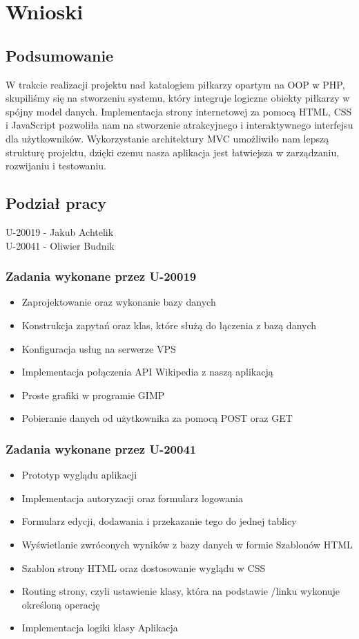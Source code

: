 \section{Wnioski}
    \subsection{Podsumowanie}
    W trakcie realizacji projektu nad katalogiem piłkarzy opartym na OOP w PHP, skupiliśmy się na stworzeniu  systemu, który integruje logiczne obiekty piłkarzy w spójny model danych. Implementacja strony internetowej za pomocą HTML, CSS i JavaScript pozwoliła nam na stworzenie atrakcyjnego i interaktywnego interfejsu dla użytkowników. Wykorzystanie architektury MVC umożliwiło nam lepszą strukturę projektu, dzięki czemu nasza aplikacja jest łatwiejsza w zarządzaniu, rozwijaniu i testowaniu.
    \subsection{Podział pracy}

    U-20019 - Jakub Achtelik\\
    U-20041 - Oliwier Budnik\\

    \subsubsection{Zadania wykonane przez U-20019}
    \begin{itemize}
        \item Zaprojektowanie oraz wykonanie bazy danych
        \item Konstrukcja zapytań oraz klas, które służą do łączenia z bazą danych
        \item Konfiguracja usług na serwerze VPS
        \item Implementacja połączenia API Wikipedia z naszą aplikacją
        \item Proste grafiki w programie GIMP
        \item Pobieranie danych od użytkownika za pomocą POST oraz GET
    \end{itemize}
    \subsubsection{Zadania wykonane przez U-20041}
    \begin{itemize}

        \item Prototyp wyglądu aplikacji
        \item Implementacja autoryzacji oraz formularz logowania
        \item Formularz edycji, dodawania i przekazanie tego do jednej tablicy
        \item Wyświetlanie zwróconych wyników z bazy danych w formie Szablonów HTML
        \item Szablon strony HTML oraz dostosowanie wyglądu w CSS
        \item Routing strony, czyli ustawienie klasy, która na podstawie /linku wykonuje określoną operację
        \item Implementacja logiki klasy Aplikacja
    \end{itemize}

